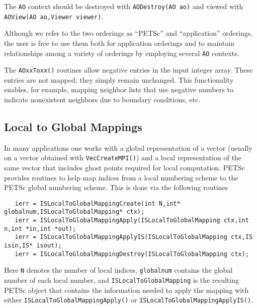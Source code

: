   
The {\tt AO} context should be destroyed with {\tt AODestroy(AO ao)}
and viewed with {\tt AOView(AO ao,Viewer viewer)}.

Although we refer to the two orderings as ``PETSc'' and
``application'' orderings, the user is free to use them both for
application orderings and to maintain relationships among a variety of
orderings by employing several {\tt AO} contexts.

The {\tt AOxxToxx()} routines allow negative entries in the input
integer array. These entries are not mapped; they simply remain
unchanged.  This functionality enables, for example, mapping neighbor
lists that use negative numbers to indicate nonexistent neighbors due
to boundary conditions, etc.

\subsection{Local to Global Mappings}
\label{sec:islocaltoglobalmapping}
 

In many applications one works with a global representation of a vector
(usually on a vector obtained with {\tt VecCreateMPI()}) 
and a local representation of the same vector that includes ghost points 
required for local computation.  
 
PETSc provides routines to help map indices from a local numbering scheme to 
the PETSc global numbering scheme. This is done via the following routines
\begin{verbatim}
   ierr = ISLocalToGlobalMappingCreate(int N,int* globalnum,ISLocalToGlobalMapping* ctx);
   ierr = ISLocalToGlobalMappingApply(ISLocalToGlobalMapping ctx,int n,int *in,int *out);
   ierr = ISLocalToGlobalMappingApplyIS(ISLocalToGlobalMapping ctx,IS isin,IS* isout);
   ierr = ISLocalToGlobalMappingDestroy(ISLocalToGlobalMapping ctx);
\end{verbatim}
 
 
Here {\tt N} denotes the number of local indices, {\tt globalnum} contains the
global number of each local number, and {\tt ISLocalToGlobalMapping} is the 
resulting PETSc object that contains the information needed to apply the mapping with 
either {\tt ISLocalToGlobalMappingApply()} or 
{\tt ISLocalToGlobalMappingApplyIS()}.  

